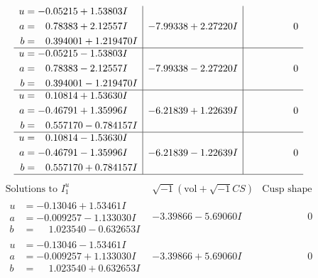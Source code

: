 \documentclass[1p]{elsarticle_modified}
\theoremstyle{definition}
\newcommand{\I}{\sqrt{-1}}
\begin{document}
$$\begin{array}{c|c|c}
\begin{aligned}
u &= -0.05215 + 1.53803 I \\
a &= \phantom{-}0.78383 + 2.12557 I \\
b &= \phantom{-}0.394001 + 1.219470 I\end{aligned}
 & -7.99338 + 2.27220 I & \phantom{-0.000000 } 0 \\ \hline\begin{aligned}
u &= -0.05215 - 1.53803 I \\
a &= \phantom{-}0.78383 - 2.12557 I \\
b &= \phantom{-}0.394001 - 1.219470 I\end{aligned}
 & -7.99338 - 2.27220 I & \phantom{-0.000000 } 0 \\ \hline\begin{aligned}
u &= \phantom{-}0.10814 + 1.53630 I \\
a &= -0.46791 + 1.35996 I \\
b &= \phantom{-}0.557170 - 0.784157 I\end{aligned}
 & -6.21839 + 1.22639 I & \phantom{-0.000000 } 0 \\ \hline\begin{aligned}
u &= \phantom{-}0.10814 - 1.53630 I \\
a &= -0.46791 - 1.35996 I \\
b &= \phantom{-}0.557170 + 0.784157 I\end{aligned}
 & -6.21839 - 1.22639 I & \phantom{-0.000000 } 0\\
 \hline 
 \end{array}$$\newpage$$\begin{array}{c|c|c}  
\text{Solutions to }I^u_{1}& \I (\text{vol} + \sqrt{-1}CS) & \text{Cusp shape}\\
 \hline 
\begin{aligned}
u &= -0.13046 + 1.53461 I \\
a &= -0.009257 - 1.133030 I \\
b &= \phantom{-}1.023540 - 0.632653 I\end{aligned}
 & -3.39866 - 5.69060 I & \phantom{-0.000000 } 0 \\ \hline\begin{aligned}
u &= -0.13046 - 1.53461 I \\
a &= -0.009257 + 1.133030 I \\
b &= \phantom{-}1.023540 + 0.632653 I\end{aligned}
 & -3.39866 + 5.69060 I & \phantom{-0.000000 } 0 \\ \hline\begin{aligned}

\end{aligned}
\end{array}$$
\end{document}
